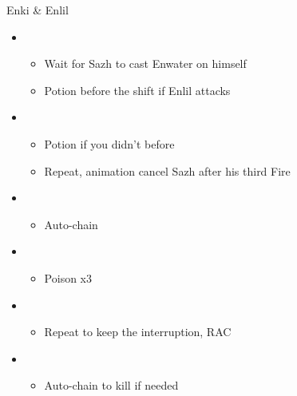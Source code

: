 \begin{battle}[1:39]{Enki \& Enlil}
\begin{itemize}
\begin{itemize}
\begin{itemize}
				      \item If Enki survived, animation cancel Sazh into [1] and then go to [2]
			      \end{itemize}
			\item \second
			      \begin{itemize}
				      \item Wait for Sazh to cast Enwater on himself
				      \item Potion before the shift if Enlil attacks
			      \end{itemize}
			\item \fifth
			      \begin{itemize}
				      \item Potion if you didn't before
				      \item Repeat, animation cancel Sazh after his third Fire
			      \end{itemize}
			\item \fourth
			      \begin{itemize}
				      \item Auto-chain
			      \end{itemize}
			\item \fifth
			      \begin{itemize}
				      \item Poison x3
			      \end{itemize}
			\item \sixth
			      \begin{itemize}
				      \item Repeat to keep the interruption, RAC
			      \end{itemize}
			\item \first
			      \begin{itemize}
				      \item Auto-chain to kill if needed
			      \end{itemize}
		\end{itemize}
		\end{itemize}
\end{battle}
